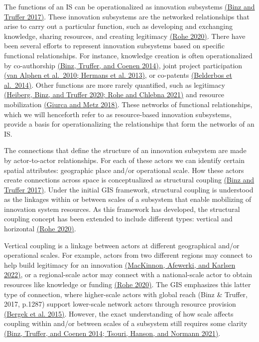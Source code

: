 \documentclass[twoside,12pt,final]{ucthesis-CA2012}
\begin{document}
\begin{ucmainmatter}
The functions of an IS can be operationalized as innovation subsystems
\href{https://www.zotero.org/google-docs/?b0G4ql}{(Binz and Truffer 2017)}.
These innovation subsystems are the networked relationships that arise
to carry out a particular function, such as developing and exchanging
knowledge, sharing resources, and creating legitimacy \href{https://www.zotero.org/google-docs/?2ginmt}{(Rohe
2020)}. There have been
several efforts to represent innovation subsystems based on specific
functional relationships. For instance, knowledge creation is often
operationalized by co-authorship \href{https://www.zotero.org/google-docs/?JjctVF}{(Binz, Truffer, and Coenen
2014)}, joint project
participation \href{https://www.zotero.org/google-docs/?4I1DET}{(van Alphen et al.~2010; Hermans et al.
2013)}, or co-patents
\href{https://www.zotero.org/google-docs/?yoTLLc}{(Belderbos et al.~2014)}.
Other functions are more rarely quantified, such as legitimacy
\href{https://www.zotero.org/google-docs/?4y09Br}{(Heiberg, Binz, and Truffer 2020; Rohe and Chlebna
2021)} and resource
mobilization \href{https://www.zotero.org/google-docs/?IfHYmx}{(Giurca and Metz
2018)}. These networks of
functional relationships, which we will henceforth refer to as
\textquotesingle resource-based innovation subsystems\textquotesingle, provide a basis for
operationalizing the relationships that form the networks of an IS.

The connections that define the structure of an innovation subsystem are
made by actor-to-actor relationships. For each of these actors we can
identify certain spatial attributes: geographic place and/or operational
scale. How these actors create connections across space is
conceptualized as \textquotesingle structural coupling\textquotesingle{} \href{https://www.zotero.org/google-docs/?EqDCFh}{(Binz and Truffer
2017)}. Under the initial
GIS framework, structural coupling is understood as the linkages within
or between scales of a subsystem that enable mobilizing of innovation
system resources. As this framework has developed, the structural
coupling concept has been extended to include different types: vertical
and horizontal \href{https://www.zotero.org/google-docs/?wQH6kZ}{(Rohe
2020)}.

Vertical coupling is a linkage between actors at different geographical
and/or operational scales. For example, actors from two different
regions may connect to help build legitimacy for an innovation
\href{https://www.zotero.org/google-docs/?B3hQjN}{(MacKinnon, Afewerki, and Karlsen
2022)}, or a regional-scale
actor may connect with a national-scale actor to obtain resources like
knowledge or funding \href{https://www.zotero.org/google-docs/?X83krq}{(Rohe
2020)}. The GIS emphasizes
this latter type of connection, where higher-scale actors \textquotesingle with global
reach\textquotesingle{} (Binz \& Truffer, 2017, p.1287) support lower-scale network
actors through resource provision \href{https://www.zotero.org/google-docs/?Rp33x9}{(Bergek et al.
2015)}. However, the exact
understanding of how scale affects coupling within and/or between scales
of a subsystem still requires some clarity \href{https://www.zotero.org/google-docs/?jM98Cs}{(Binz, Truffer, and Coenen
2014; Tsouri, Hanson, and Normann
2021)}.


\end{ucmainmatter}
\end{document}
